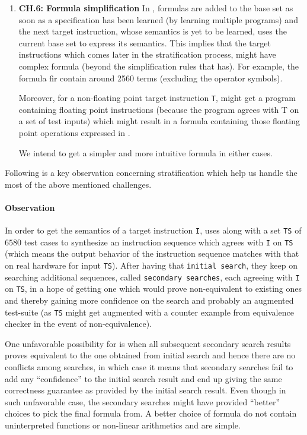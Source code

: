 \begin{enumerate}
    \item \textbf{CH.6: Formula simplification} In \Strata{}, formulas are added to the base set as soon as a specification has been learned (by learning multiple programs) and  the next target instruction, whose semantics is yet to be learned, uses the current base set to express its semantics. This implies that the target instructions  which comes later in the stratification process, might have complex formula (beyond the simplification rules that \Strata has). For example, the \Strata formula
    fir  contain around 2560 terms (excluding the operator symbols). 
    
    Moreover, for a non-floating point target instruction {\tt T}, \Strata might get a program containing floating point instructions (because the program agrees with T on a set of test inputs) which might result in a formula containing those floating point operations expressed in \uif{}.
    
    We intend to get a simpler and more intuitive formula in either cases. 
       
        

\end{enumerate} 

Following is a key observation concerning stratification which help us handle
the most of the above mentioned challenges.

\paragraph{Observation} In order to get the semantics of a target instruction
{\tt I}, \Strata uses \Stoke along with a set {\tt TS} of $6580$ test cases to
synthesize an instruction sequence which agrees with {\tt I} on {\tt TS} (which
    means the output behavior of the instruction sequence matches with that on
    real hardware for input {\tt TS}). After having that {\tt initial search},
           they keep on searching  additional sequences, called {\tt secondary
             searches}, each agreeing with {\tt I} on {\tt TS}, in a hope of
             getting  one which would prove non-equivalent to existing ones and
             thereby gaining more confidence on the search and probably an
             augmented test-suite (as {\tt TS} might get augmented with a
                 counter example from equivalence checker in the event of
                 non-equivalence). 
      
      One unfavorable possibility for \Strata is when all subsequent secondary
      search results proves  equivalent to the one obtained from initial search
      and hence there are no conflicts among searches, in which case it  means
      that  secondary searches fail to add any ``confidence'' to the initial
      search result and end up giving the same correctness guarantee as provided
      by the initial search result. Even though in such unfavorable case, the
      secondary searches might have provided ``better'' choices to pick the
      final formula from. A better choice of formula do not contain
      uninterpreted functions or  non-linear arithmetics and are simple.  
    
